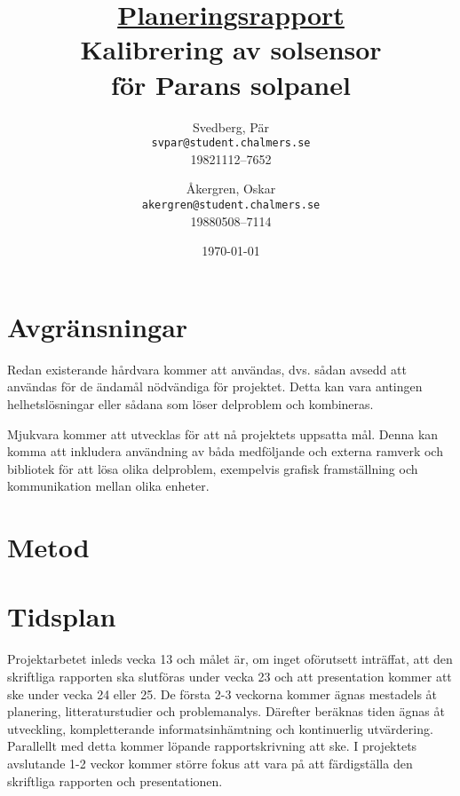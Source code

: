 \documentclass{article}
\author{Svedberg, Pär\\ \texttt{svpar@student.chalmers.se}  \\ 
            19821112--7652 \and
            Åkergren, Oskar\\ \texttt{akergren@student.chalmers.se}  \\ 19880508--7114
}
\title{\vspace{2cm} \underline{Planeringsrapport} \\ Kalibrering av solsensor \\ för Parans solpanel \vspace{1cm}}
\date{\vspace{8cm}\today}
\begin{document}
\maketitle
\section{Avgränsningar} %
\label{sec:avgr_nsningar}
    Redan existerande hårdvara kommer att användas, dvs. sådan avsedd att användas för de ändamål nödvändiga för projektet. Detta kan vara antingen helhetslösningar eller sådana som löser delproblem och kombineras. \bigskip

    Mjukvara kommer att utvecklas för att nå projektets uppsatta mål. Denna kan komma att inkludera användning av båda medföljande och externa ramverk och bibliotek för att lösa olika delproblem, exempelvis grafisk framställning och kommunikation mellan olika enheter.

\section{Metod}
\label{sec:metod} %


\section{Tidsplan}
\label{sec:tidsplan} %
    Projektarbetet inleds vecka 13 och målet är, om inget oförutsett inträffat, att den skriftliga rapporten ska slutföras under vecka 23 och att presentation kommer att ske under vecka 24 eller 25. De första 2-3 veckorna kommer ägnas mestadels åt planering, litteraturstudier och problemanalys. Därefter beräknas tiden ägnas åt utveckling, kompletterande informatsinhämtning och kontinuerlig utvärdering. Parallellt med detta kommer löpande rapportskrivning att ske. I projektets avslutande 1-2 veckor kommer större fokus att vara på att färdigställa den skriftliga rapporten och presentationen. \bigskip
\end{document}
